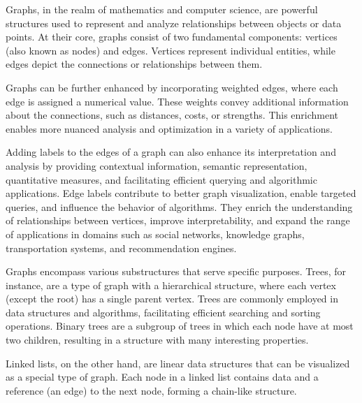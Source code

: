 Graphs, in the realm of mathematics and computer science, are powerful structures used to represent and analyze relationships between objects or data points.
At their core, graphs consist of two fundamental components: vertices (also known as nodes) and edges.
Vertices represent individual entities, while edges depict the connections or relationships between them.

Graphs can be further enhanced by incorporating weighted edges, where each edge is assigned a numerical value.
These weights convey additional information about the connections, such as distances, costs, or strengths.
This enrichment enables more nuanced analysis and optimization in a variety of applications.

Adding labels to the edges of a graph can also enhance its interpretation and analysis by providing contextual information, semantic representation, quantitative measures, and facilitating efficient querying and algorithmic applications.
Edge labels contribute to better graph visualization, enable targeted queries, and influence the behavior of algorithms.
They enrich the understanding of relationships between vertices, improve interpretability, and expand the range of applications in domains such as social networks, knowledge graphs, transportation systems, and recommendation engines.

Graphs encompass various substructures that serve specific purposes.
Trees, for instance, are a type of graph with a hierarchical structure, where each vertex (except the root) has a single parent vertex.
Trees are commonly employed in data structures and algorithms, facilitating efficient searching and sorting operations.
Binary trees are a subgroup of trees in which each node have at most two children, resulting in a structure with many interesting properties.

Linked lists, on the other hand, are linear data structures that can be visualized as a special type of graph.
Each node in a linked list contains data and a reference (an edge) to the next node, forming a chain-like structure.
